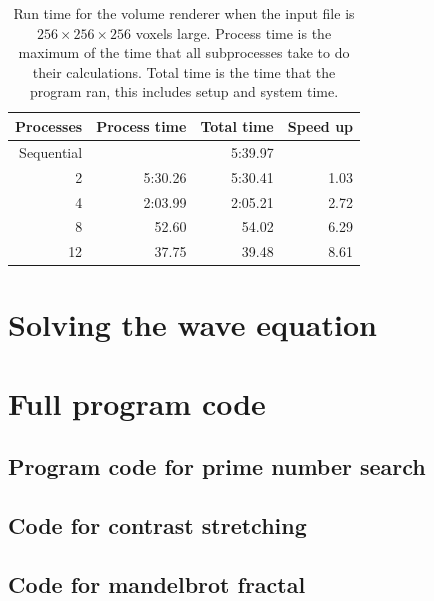 \documentclass[a4paper]{article}
\begin{document}
\begin{table}[h]
	\centering
	\caption{Run time for the volume renderer when the input file is $256 \times 256 \times 256$ voxels large. Process time is the maximum of the time that all subprocesses take to do their calculations. Total time is the time that the program ran, this includes setup and system time.}
	\label{tbl:render2}
	\begin{tabular}{r|r|r|r}
		Processes & Process time & Total time & Speed up \\ \hline
		Sequential & & 5:39.97 & \\
		 2 & 5:30.26 & 5:30.41 & 1.03 \\
		 4 & 2:03.99 & 2:05.21 & 2.72 \\
		 8 &   52.60 &   54.02 & 6.29 \\
		12 &   37.75 &   39.48 & 8.61
	\end{tabular}
\end{table}

\section{Solving the wave equation}

\clearpage
\appendix
\section{Full program code}
\subsection{Program code for prime number search}



\subsection{Code for contrast stretching}


\subsection{Code for mandelbrot fractal}


\end{document}
